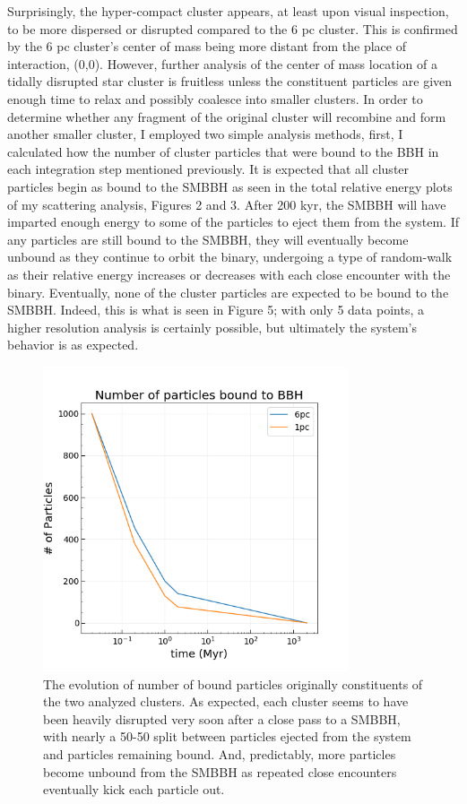 \documentclass{aastex62}
\begin{document}
Surprisingly, the hyper-compact cluster appears, at least upon visual inspection, to be more dispersed or disrupted compared to the 6 pc cluster. This is confirmed by the 6 pc cluster's center of mass being more distant from the place of interaction, (0,0). However, further analysis of the center of mass location of a tidally disrupted star cluster is fruitless unless the constituent particles are given enough time to relax and possibly coalesce into smaller clusters. In order to determine whether any fragment of the original cluster will recombine and form another smaller cluster, I employed two simple analysis methods, first, I calculated how the number of cluster particles that were bound to the BBH in each integration step mentioned previously. It is expected that all cluster particles begin as bound to the SMBBH as seen in the total relative energy plots of my scattering analysis, Figures 2 and 3. After 200 kyr, the SMBBH will have imparted enough energy to some of the particles to eject them from the system. If any particles are still bound to the SMBBH, they will eventually become unbound as they continue to orbit the binary, undergoing a type of random-walk as their relative energy increases or decreases with each close encounter with the binary. Eventually, none of the cluster particles are expected to be bound to the SMBBH. Indeed, this is what is seen in Figure 5; with only 5 data points, a higher resolution analysis is certainly possible, but ultimately the system's behavior is as expected.
\begin{figure}
\includegraphics[width=9cm,height=9cm]{./Images/bound_particle_number.png}
\centering
\caption{The evolution of number of bound particles originally constituents of the two analyzed clusters. As expected, each cluster seems to have been heavily disrupted very soon after a close pass to a SMBBH, with nearly a 50-50 split between particles ejected from the system and particles remaining bound. And, predictably, more particles become unbound from the SMBBH as repeated close encounters eventually kick each particle out.\label{fig6}}
\end{figure}
\end{document}
